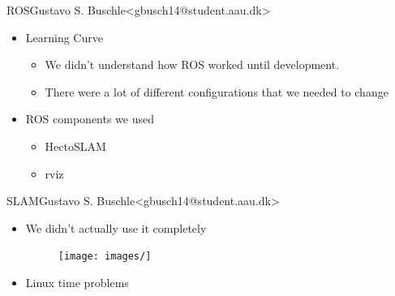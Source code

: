 \begin{frame}{ROS}{Gustavo S. Buschle\newline<gbusch14@student.aau.dk>}
    \begin{itemize}
        \item <1-> Learning Curve
            \begin{itemize}
                \item <1-> We didn't understand how ROS worked until development.
                \item <2-> There were a lot of different configurations that we needed to change
            \end{itemize}
        \item <3-> ROS components we used
            \begin{itemize}
                \item <3-> HectoSLAM
                \item <4-> rviz
            \end{itemize}
    \end{itemize}
\end{frame}

\begin{frame}{SLAM}{Gustavo S. Buschle\newline<gbusch14@student.aau.dk>}
    \begin{itemize}
        \item <1-> We didn't actually use it completely
        \begin{figure}[h!]
            \texttt{[image: images/]}
        \end{figure}
        \item <2-> Linux time problems
    \end{itemize}
\end{frame}
